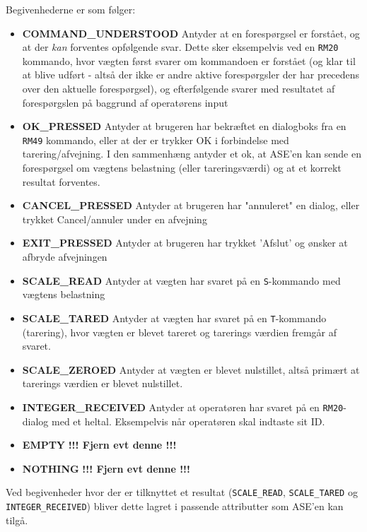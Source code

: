\documentclass[a4paper]{article}
\begin{document}
Begivenhederne er som følger:

\begin{itemize}
  \item \textbf{COMMAND\_UNDERSTOOD} Antyder at en forespørgsel er forstået, og at der \emph{kan} forventes opfølgende svar. Dette sker eksempelvis ved en \texttt{RM20} kommando, hvor vægten først svarer om kommandoen er forstået (og klar til at blive udført - altså der ikke er andre aktive forespørgsler der har precedens over den aktuelle forespørgsel), og efterfølgende svarer med resultatet af forespørgslen på baggrund af operatørens input
  \item \textbf{OK\_PRESSED} Antyder at brugeren har bekræftet en dialogboks fra en \texttt{RM49} kommando, eller at der er trykker OK i forbindelse med tarering/afvejning. I den sammenhæng antyder et ok, at ASE'en kan sende en forespørgsel om vægtens belastning (eller tareringsværdi) og at et korrekt resultat forventes.
  \item \textbf{CANCEL\_PRESSED} Antyder at brugeren har "annuleret" en dialog, eller trykket Cancel/annuler under en afvejning
  \item \textbf{EXIT\_PRESSED} Antyder at brugeren har trykket 'Afslut' og ønsker at afbryde afvejningen
  \item \textbf{SCALE\_READ} Antyder at vægten har svaret på en \texttt{S}-kommando med vægtens belastning
  \item \textbf{SCALE\_TARED} Antyder at vægten har svaret på en \texttt{T}-kommando (tarering), hvor vægten er blevet tareret og tarerings værdien fremgår af svaret.
  \item \textbf{SCALE\_ZEROED} Antyder at vægten er blevet nulstillet, altså primært at tarerings værdien er blevet nulstillet.
  \item \textbf{INTEGER\_RECEIVED} Antyder at operatøren har svaret på en \texttt{RM20}-dialog med et heltal. Eksempelvis når operatøren skal indtaste sit ID.
  \item \textbf{EMPTY} \textbf{!!! Fjern evt denne !!!}
  \item \textbf{NOTHING} \textbf{!!! Fjern evt denne !!!}
\end{itemize}

Ved begivenheder hvor der er tilknyttet et resultat (\texttt{SCALE\_READ}, \texttt{SCALE\_TARED} og \texttt{INTEGER\_RECEIVED}) bliver dette lagret i passende attributter som ASE'en kan tilgå.

\end{document}
